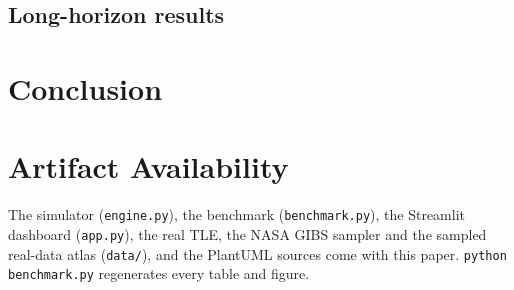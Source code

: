 \documentclass[conference]{IEEEtran}
\theoremstyle{remark}
\begin{document}
\subsection{Long-horizon results}


\section{Conclusion}


\section*{Artifact Availability}
The simulator (\texttt{engine.py}), the benchmark (\texttt{benchmark.py}), the Streamlit dashboard (\texttt{app.py}), the real TLE, the NASA GIBS sampler and the sampled real-data atlas (\texttt{data/}), and the PlantUML sources come with this paper. \texttt{python benchmark.py} regenerates every table and figure.
\end{document}
